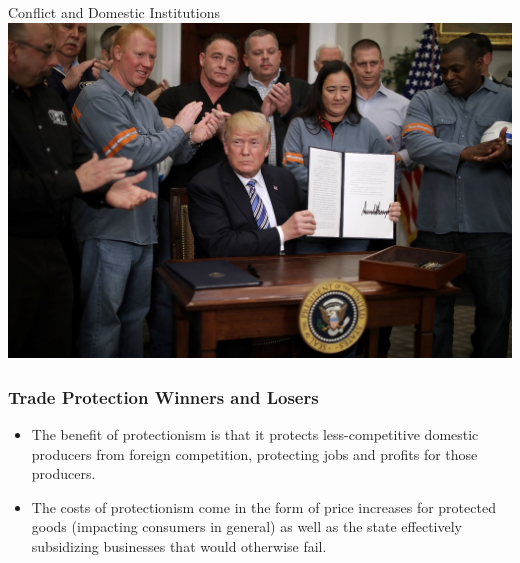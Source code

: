 \documentclass{beamer}
\begin{document}
\begin{frame}{\LARGE Conflict and Domestic Institutions}
	\centering
	\includegraphics[width=\textwidth,height=0.9\textheight,keepaspectratio]{trump.jpg}
\end{frame}

\begin{frame} 
	\frametitle{\LARGE Trade Protection Winners and Losers}
	\begin{itemize}
		\item The benefit of protectionism is that it protects less-competitive domestic producers from foreign competition, protecting jobs and profits for those producers. \pause
		\item The costs of protectionism come in the form of price increases for protected goods (impacting consumers in general) as well as the state effectively subsidizing businesses that would otherwise fail. 
	\end{itemize}
\end{frame}
\end{document}
